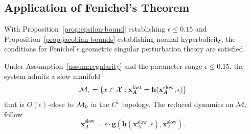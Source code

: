 \subsection{Application of Fenichel's Theorem}

With Proposition~\ref{prop:epsilon-bound} establishing $\epsilon \leq 0.15$
and Proposition~\ref{prop:jacobian-bounds} establishing normal hyperbolicity,
the conditions for Fenichel's geometric singular perturbation theory are
satisfied.

\begin{theorem}
\label{thm:slow-manifold}
Under Assumption~\ref{assum:regularity} and the parameter range $\epsilon \leq 0.15$,
the system admits a slow manifold
\[
\mathcal{M}_\epsilon = \{ x \in \mathcal{X} : \mathbf{x}_A^{\mathrm{fast}} = \mathbf{h}(\mathbf{x}_A^{\mathrm{slow}}, \epsilon) \}
\]
that is $O(\epsilon)$-close to $\mathcal{M}_0$ in the $C^1$ topology. The reduced
dynamics on $\mathcal{M}_\epsilon$ follow
\[
\dot{\mathbf{x}}_A^{\mathrm{slow}} = \epsilon \cdot
\mathbf{g}(\mathbf{h}(\mathbf{x}_A^{\mathrm{slow}}, \epsilon),
\mathbf{x}_A^{\mathrm{slow}}).
\]
\end{theorem}

